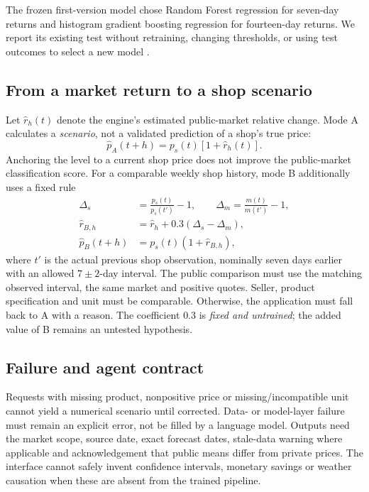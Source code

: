 \documentclass[11pt,a4paper]{article}
\begin{document}
The frozen first-version model chose Random Forest regression for seven-day returns and histogram gradient boosting regression for fourteen-day returns. We report its existing test without retraining, changing thresholds, or using test outcomes to select a new model \cite{fmpafrozen}.

\subsection{From a market return to a shop scenario}
Let $\widehat r_h(t)$ denote the engine's estimated public-market relative change. Mode A calculates a \emph{scenario}, not a validated prediction of a shop's true price:
\begin{equation}
\widehat p_A(t+h)=p_s(t)\left[1+\widehat r_h(t)\right].
\label{eq:a}
\end{equation}
Anchoring the level to a current shop price does not improve the public-market classification score. For a comparable weekly shop history, mode B additionally uses a fixed rule
\begin{align}
\Delta_s&=\frac{p_s(t)}{p_s(t')}-1, \qquad \Delta_m=\frac{m(t)}{m(t')}-1,\\
\widehat r_{B,h}&=\widehat r_h+0.3(\Delta_s-\Delta_m),\\
\widehat p_B(t+h)&=p_s(t)(1+\widehat r_{B,h}),
\end{align}
where $t'$ is the actual previous shop observation, nominally seven days earlier with an allowed $7\pm2$-day interval. The public comparison must use the matching observed interval, the same market and positive quotes. Seller, product specification and unit must be comparable. Otherwise, the application must fall back to A with a reason. The coefficient $0.3$ is \emph{fixed and untrained}; the added value of B remains an untested hypothesis.

\subsection{Failure and agent contract}
Requests with missing product, nonpositive price or missing/incompatible unit cannot yield a numerical scenario until corrected. Data- or model-layer failure must remain an explicit error, not be filled by a language model. Outputs need the market scope, source date, exact forecast dates, stale-data warning where applicable and acknowledgement that public means differ from private prices. The interface cannot safely invent confidence intervals, monetary savings or weather causation when these are absent from the trained pipeline.
\end{document}
